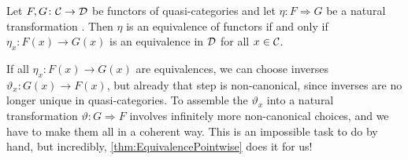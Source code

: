 \begin{thm}\label{thm:EquivalencePointwise}
	Let $F,G\colon \mathcal{C}\rightarrow\mathcal{D}$ be functors of quasi-categories and let $\eta\colon F\Rightarrow G$ be a natural transformation . Then $\eta$ is an equivalence of functors if and only if $\eta_x\colon F(x)\rightarrow G(x)$ is an equivalence in $\mathcal{D}$ for all $x\in\mathcal{C}$.
\end{thm}
If all $\eta_x\colon F(x)\rightarrow G(x)$ are equivalences, we can choose inverses $\vartheta_x\colon G(x)\rightarrow F(x)$, but already that step is non-canonical, since inverses are no longer unique in quasi-categories. To assemble the $\vartheta_x$ into a natural transformation $\vartheta\colon G\Rightarrow F$ involves infinitely more non-canonical choices, and we have to make them all in a coherent way. This is an impossible task to do by hand, but incredibly, \cref{thm:EquivalencePointwise} does it for us!
